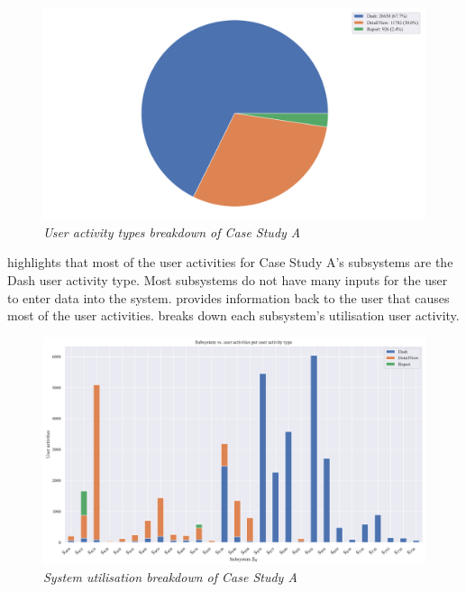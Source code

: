 \begin{figure}[!htb]
	\centering %
	\includegraphics[width=0.95\linewidth]{img/ch3/analysis/case_A_breakdown.pdf}
	\caption[User activity types breakdown of Case Study A]
	{\textit{User activity types breakdown of Case Study A}}\label{fig:ch3_caseABreakdown}
\end{figure} 

 highlights that most of the user activities for Case Study A's subsystems are the Dash user activity type. Most subsystems do not have many inputs for the user to enter data into the system.  provides information back to the user that causes most of the user activities.  breaks down each subsystem's utilisation user activity.

\begin{figure}[!htb]
	\centering %
	\includegraphics[width=0.95\linewidth]{img/ch3/analysis/case_A_subsystems_1.pdf}
	\caption[System utilisation breakdown of Case Study A]
	{\textit{System utilisation breakdown of Case Study A}}\label{fig:ch3_caseAAnalysis}
\end{figure}

